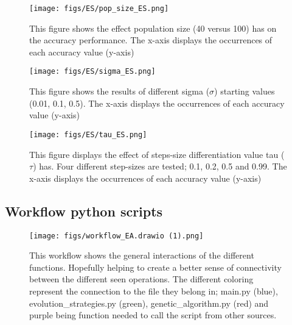 \documentclass{article}
\begin{document}
\begin{figure*}[htbp]
    \centering
    \texttt{[image: figs/ES/pop\_size\_ES.png]}
    \caption{
    This figure shows the effect population size (40 versus 100) has on the accuracy performance. 
    The x-axis displays the occurrences of each accuracy value (y-axis) 
    }
    \label{fig:A_ES_popsize}
\end{figure*}


\begin{figure*}[htbp]
    \centering
    \texttt{[image: figs/ES/sigma\_ES.png]}
    \caption{
    This figure shows the results of different sigma ($\sigma$) starting values (0.01, 0.1, 0.5). 
    The x-axis displays the occurrences of each accuracy value (y-axis)
    }
    \label{fig:A_ES_sigmas}
\end{figure*}


\begin{figure*}[htbp]
    \centering
    \texttt{[image: figs/ES/tau\_ES.png]}
    \caption{
    This figure displays the effect of steps-size differentiation value tau ($\tau$) has. 
    Four different step-sizes are tested; 0.1, 0.2, 0.5 and 0.99. 
    The x-axis displays the occurrences of each accuracy value (y-axis)
    }
    \label{fig:A_ES_tau}
\end{figure*}

\newpage

\subsection{Workflow python scripts}
\label{app:workflow}

\begin{figure}[htbp]
    \centering
    \texttt{[image: figs/workflow\_EA.drawio (1).png]}
    \caption{ 
        This workflow shows the general interactions of the different functions. 
        Hopefully helping to create a better sense of connectivity between the different seen operations. 
        The different coloring represent the connection to the file they belong in; 
        main.py (blue), evolution\_strategies.py (green), genetic\_algorithm.py (red) and purple being function needed to call the script from other sources.
    }
    \label{fig:A_workflow}
\end{figure}
\end{document}
